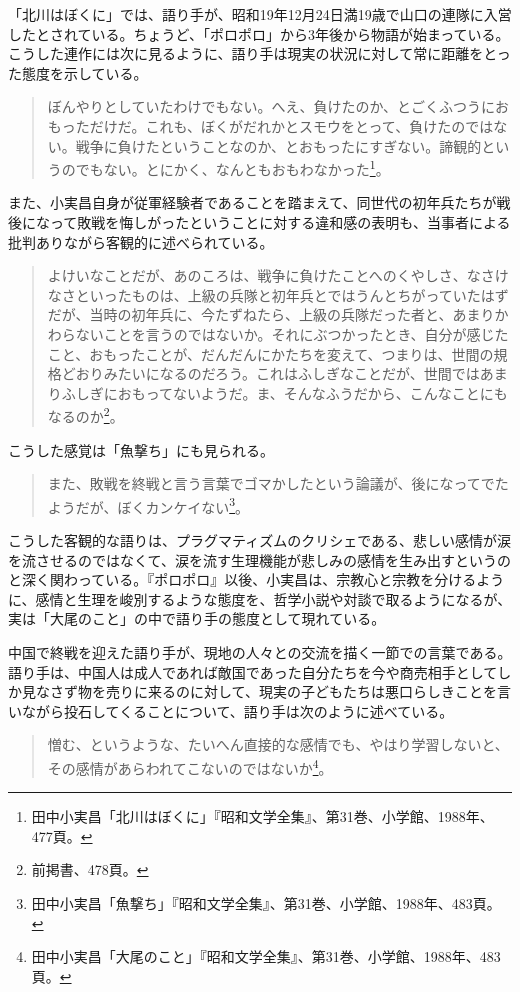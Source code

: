 「北川はぼくに」では、語り手が、昭和19年12月24日満19歳で山口の連隊に入営したとされている。ちょうど、「ポロポロ」から3年後から物語が始まっている。こうした連作には次に見るように、語り手は現実の状況に対して常に距離をとった態度を示している。

\begin{quote}
  ぼんやりとしていたわけでもない。へえ、負けたのか、とごくふつうにおもっただけだ。これも、ぼくがだれかとスモウをとって、負けたのではない。戦争に負けたということなのか、とおもったにすぎない。諦観的というのでもない。とにかく、なんともおもわなかった\footnote{田中小実昌「北川はぼくに」『昭和文学全集』、第31巻、小学館、1988年、477頁。}。
\end{quote}

また、小実昌自身が従軍経験者であることを踏まえて、同世代の初年兵たちが戦後になって敗戦を悔しがったということに対する違和感の表明も、当事者による批判ありながら客観的に述べられている。
\begin{quote}
  よけいなことだが、あのころは、戦争に負けたことへのくやしさ、なさけなさといったものは、上級の兵隊と初年兵とではうんとちがっていたはずだが、当時の初年兵に、今たずねたら、上級の兵隊だった者と、あまりかわらないことを言うのではないか。それにぶつかったとき、自分が感じたこと、おもったことが、だんだんにかたちを変えて、つまりは、世間の規格どおりみたいになるのだろう。これはふしぎなことだが、世間ではあまりふしぎにおもってないようだ。ま、そんなふうだから、こんなことにもなるのか\footnote{前掲書、478頁。}。
\end{quote}
こうした感覚は「魚撃ち」にも見られる。
\begin{quote}
  また、敗戦を終戦と言う言葉でゴマかしたという論議が、後になってでたようだが、ぼくカンケイない\footnote{田中小実昌「魚撃ち」『昭和文学全集』、第31巻、小学館、1988年、483頁。}。
\end{quote}
こうした客観的な語りは、プラグマティズムのクリシェである、悲しい感情が涙を流させるのではなくて、涙を流す生理機能が悲しみの感情を生み出すというのと深く関わっている。『ポロポロ』以後、小実昌は、宗教心と宗教を分けるように、感情と生理を峻別するような態度を、哲学小説や対談で取るようになるが、実は「大尾のこと」の中で語り手の態度として現れている。

中国で終戦を迎えた語り手が、現地の人々との交流を描く一節での言葉である。語り手は、中国人は成人であれば敵国であった自分たちを今や商売相手としてしか見なさず物を売りに来るのに対して、現実の子どもたちは悪口らしきことを言いながら投石してくることについて、語り手は次のように述べている。

\begin{quote}
  憎む、というような、たいへん直接的な感情でも、やはり学習しないと、その感情があらわれてこないのではないか\footnote{田中小実昌「大尾のこと」『昭和文学全集』、第31巻、小学館、1988年、483頁。}。
\end{quote}

